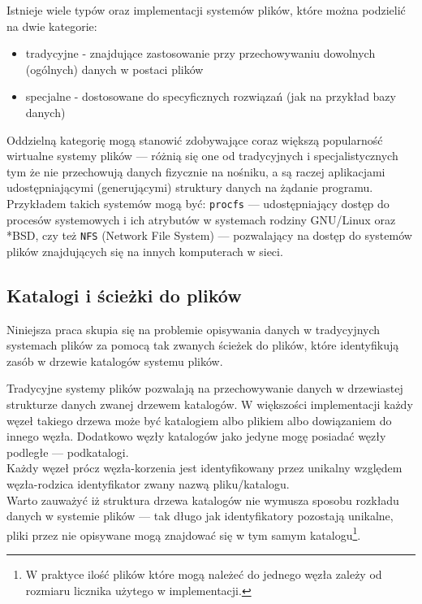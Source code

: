 \par
Istnieje wiele typów oraz implementacji systemów plików, które można podzielić na dwie kategorie:

\begin{itemize}
\item tradycyjne - znajdujące zastosowanie przy przechowywaniu dowolnych (ogólnych) danych w postaci plików
\item specjalne - dostosowane do specyficznych rozwiązań (jak na przykład bazy danych)
\end{itemize}

Oddzielną kategorię mogą stanowić zdobywające coraz większą popularność wirtualne systemy plików --- różnią się one od tradycyjnych i specjalistycznych tym że nie przechowują danych fizycznie na nośniku, a są raczej aplikacjami udostępniającymi (generującymi) struktury danych na żądanie programu. Przykładem takich systemów mogą być: \texttt{procfs} --- udostępniający dostęp do procesów systemowych i ich atrybutów w systemach rodziny GNU/Linux oraz *BSD, czy też \texttt{NFS} (Network File System) --- pozwalający na dostęp do systemów plików znajdujących się na innych komputerach w sieci.

\subsection{Katalogi i ścieżki do plików}
\par
Niniejsza praca skupia się na problemie opisywania danych w tradycyjnych systemach plików za pomocą tak zwanych ścieżek do plików, które identyfikują zasób w drzewie katalogów systemu plików.

\par
Tradycyjne systemy plików pozwalają na przechowywanie danych w drzewiastej strukturze danych zwanej drzewem katalogów. W większości implementacji każdy węzeł takiego drzewa może być katalogiem albo plikiem albo dowiązaniem do innego węzła. Dodatkowo węzły katalogów jako jedyne mogę posiadać węzły podległe --- podkatalogi.\\
Każdy węzeł prócz węzła-korzenia jest identyfikowany przez unikalny względem węzła-rodzica identyfikator zwany nazwą pliku/katalogu.\\
Warto zauważyć iż struktura drzewa katalogów nie wymusza sposobu rozkładu danych w systemie plików --- tak długo jak identyfikatory pozostają unikalne, pliki przez nie opisywane mogą znajdować się w tym samym katalogu\footnote{W praktyce ilość plików które mogą należeć do jednego węzła zależy od rozmiaru licznika użytego w implementacji.}.

